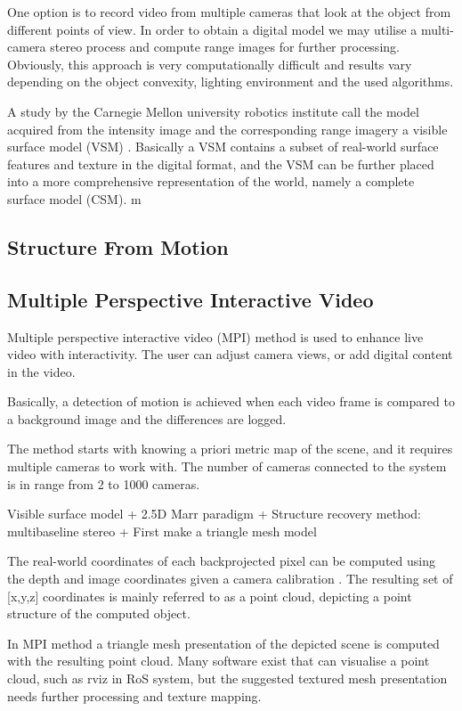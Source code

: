 \documentclass[12pt,a4paper,oneside,pdftex]{report}
\begin{document}
One option is to record video from multiple cameras that look at the object from different points of view. In order to obtain a digital model we may utilise a multi-camera stereo process and compute range images for further processing. Obviously, this approach is very computationally difficult and results vary depending on the object convexity, lighting environment and the used algorithms.  

A study by the Carnegie Mellon university robotics institute call the model acquired from the intensity image and the corresponding range imagery a visible surface model (VSM) \cite{Rander97}. Basically a VSM contains a subset of real-world surface features and texture in the digital format, and the VSM can be further placed into a more comprehensive representation of the world, namely a complete surface model (CSM). 
m

\subsection{Structure From Motion}



\subsection{Multiple Perspective Interactive Video}

Multiple perspective interactive video (MPI) method is used to enhance live video with interactivity. The user can adjust camera views, or add digital content in the video. 

Basically, a detection of motion is achieved when each video frame is compared to a background image and the differences are logged. 

The method starts with knowing a priori metric map of the scene, and it requires multiple cameras to work with. The number of cameras connected to the system is in range from 2 to 1000 cameras.

Visible surface model
+ 2.5D Marr paradigm
+ Structure recovery method: multibaseline stereo
+ First make a triangle mesh model 

The real-world coordinates of each backprojected pixel can be computed using the depth and image coordinates given a camera calibration \cite{Rander97}. The resulting set of [x,y,z] coordinates is mainly referred to as a point cloud, depicting a point structure of the computed object.

In MPI method a triangle mesh presentation of the depicted scene is computed with the resulting point cloud. Many software exist that can visualise a point cloud, such as rviz in RoS system, but the suggested textured mesh presentation needs further processing and texture mapping. 
\end{document}
